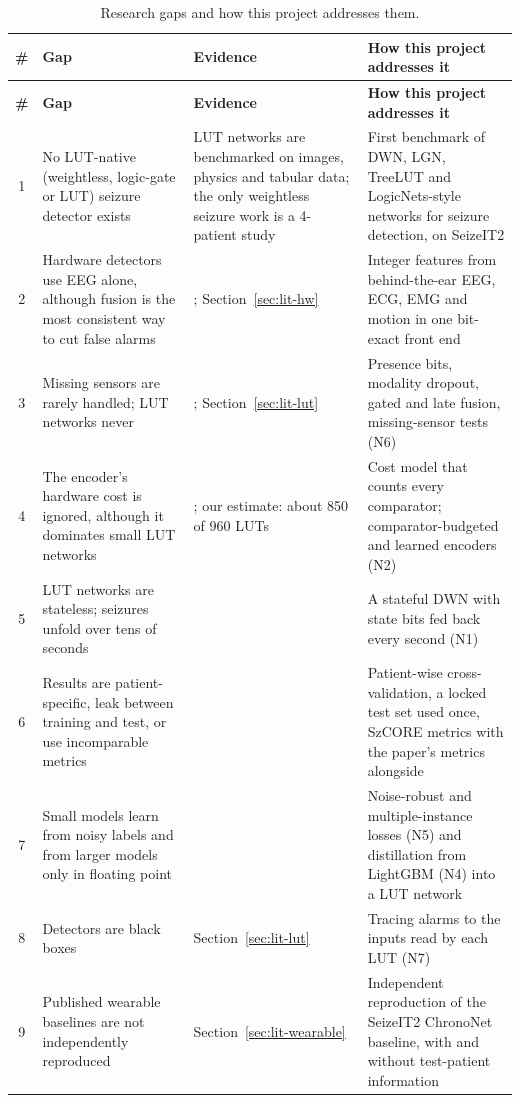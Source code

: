\begin{xltabular}{\textwidth}{@{}cP{45mm}LL@{}}
\caption{Research gaps and how this project addresses them.}\label{tab:lit-gaps}\\
\toprule
\textbf{\#} & \textbf{Gap} & \textbf{Evidence} & \textbf{How this project addresses it}\\
\midrule
\endfirsthead
\toprule
\textbf{\#} & \textbf{Gap} & \textbf{Evidence} & \textbf{How this project addresses it}\\
\midrule
\endhead
\small 1 & \small No LUT-native (weightless, logic-gate or LUT) seizure detector exists & \small LUT networks are benchmarked on images, physics and tabular data; the only weightless seizure work is a 4-patient study \cite{deaguiar2015wisard} & \small First benchmark of DWN, LGN, TreeLUT and LogicNets-style networks for seizure detection, on SeizeIT2\\
\small 2 & \small Hardware detectors use EEG alone, although fusion is the most consistent way to cut false alarms & \small \cite{vandecasteele2021ecg,zhang2024tcs}; Section~\ref{sec:lit-hw} & \small Integer features from behind-the-ear EEG, ECG, EMG and motion in one bit-exact front end\\
\small 3 & \small Missing sensors are rarely handled; LUT networks never & \small \cite{zhang2024cyclic}; Section~\ref{sec:lit-lut} & \small Presence bits, modality dropout, gated and late fusion, missing-sensor tests (N6)\\
\small 4 & \small The encoder's hardware cost is ignored, although it dominates small LUT networks & \small \cite{mecik2025thermo}; our estimate: about 850 of 960 LUTs & \small Cost model that counts every comparator; comparator-budgeted and learned encoders (N2)\\
\small 5 & \small LUT networks are stateless; seizures unfold over tens of seconds & \small \cite{buhrer2025rdlgn} & \small A stateful DWN with state bits fed back every second (N1)\\
\small 6 & \small Results are patient-specific, leak between training and test, or use incomparable metrics & \small \cite{brookshire2024leakage,ziyabari2017metrics,dan2025szcorechallenge} & \small Patient-wise cross-validation, a locked test set used once, SzCORE metrics with the paper's metrics alongside\\
\small 7 & \small Small models learn from noisy labels and from larger models only in floating point & \small \cite{shama2026bundl,zheng2023kdgnn} & \small Noise-robust and multiple-instance losses (N5) and distillation from LightGBM (N4) into a LUT network\\
\small 8 & \small Detectors are black boxes & \small Section~\ref{sec:lit-lut} & \small Tracing alarms to the inputs read by each LUT (N7)\\
\small 9 & \small Published wearable baselines are not independently reproduced & \small Section~\ref{sec:lit-wearable} & \small Independent reproduction of the SeizeIT2 ChronoNet baseline, with and without test-patient information\\
\bottomrule
\end{xltabular}
